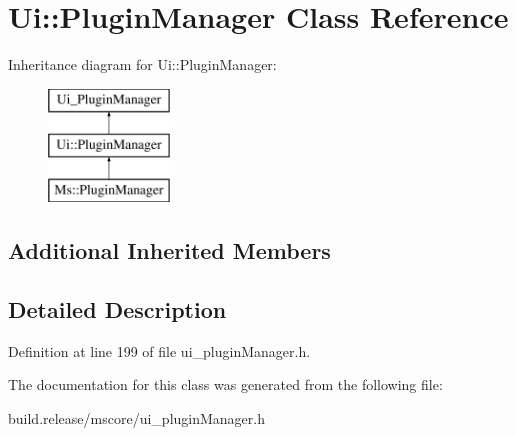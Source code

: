 \hypertarget{class_ui_1_1_plugin_manager}{}\section{Ui\+:\+:Plugin\+Manager Class Reference}
\label{class_ui_1_1_plugin_manager}
Inheritance diagram for Ui\+:\+:Plugin\+Manager\+:\begin{figure}[H]
\begin{center}
\leavevmode
\includegraphics[height=3.000000cm]{class_ui_1_1_plugin_manager}
\end{center}
\end{figure}
\subsection*{Additional Inherited Members}


\subsection{Detailed Description}


Definition at line 199 of file ui\+\_\+plugin\+Manager.\+h.



The documentation for this class was generated from the following file\+:\begin{DoxyCompactItemize}
\item 
build.\+release/mscore/ui\+\_\+plugin\+Manager.\+h\end{DoxyCompactItemize}
